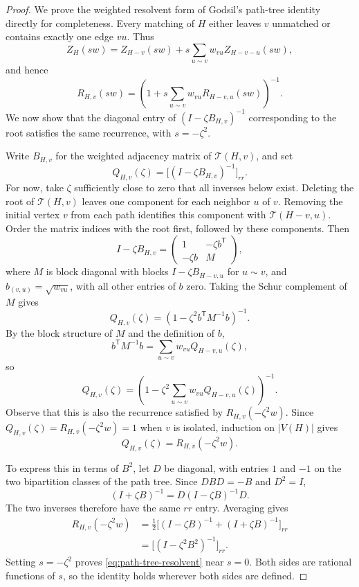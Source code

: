 \documentclass[11pt,reqno,letterpaper]{amsart}
\numberwithin{equation}{section}
\theoremstyle{definition}
\theoremstyle{remark}
\begin{document}
\begin{proof}
We prove the weighted resolvent form of Godsil's
path-tree identity~\cite{Godsil} directly for completeness.
Every matching of $H$ either leaves $v$ unmatched or contains
exactly one edge $vu$. Thus
\[
 Z_H(sw)=Z_{H-v}(sw)
       +s\sum_{u\sim v}w_{vu}Z_{H-v-u}(sw),
\]
and hence
\[
 R_{H,v}(sw)
 =\left(1+s\sum_{u\sim v}w_{vu}R_{H-v,u}(sw)\right)^{-1}.
\]
We now show that the diagonal entry of $(I-\zeta B_{H,v})^{-1}$
corresponding to the root satisfies the same recurrence,
with $s=-\zeta^2$.

Write $B_{H,v}$ for the weighted adjacency matrix of
$\mathcal T(H,v)$, and set
\[
 Q_{H,v}(\zeta)
 =\bigl[(I-\zeta B_{H,v})^{-1}\bigr]_{rr}.
\]
For now, take $\zeta$ sufficiently close to zero that all
inverses below exist.
Deleting the root of $\mathcal T(H,v)$ leaves one component
for each neighbor $u$ of $v$.
Removing the initial vertex $v$ from each path identifies
this component with $\mathcal T(H-v,u)$. Order the matrix indices with the root first, followed by
these components. Then
\[
 I-\zeta B_{H,v}
 =\begin{pmatrix}
    1&-\zeta b^{\mathsf T}\\
    -\zeta b&M
   \end{pmatrix},
\]
where $M$ is block diagonal with blocks $I-\zeta B_{H-v,u}$
for $u\sim v$, and $b_{(v,u)}=\sqrt{w_{vu}}$, with all other
entries of $b$ zero.
Taking the Schur complement of $M$ gives
\[
 Q_{H,v}(\zeta)
 =\left(1-\zeta^2b^{\mathsf T}M^{-1}b\right)^{-1}.
\]
By the block structure of $M$ and the definition of $b$,
\[
 b^{\mathsf T}M^{-1}b
 =\sum_{u\sim v}w_{vu}Q_{H-v,u}(\zeta),
\]
so
\[
 Q_{H,v}(\zeta)
 =\left(1-\zeta^2\sum_{u\sim v}
                   w_{vu}Q_{H-v,u}(\zeta)\right)^{-1}.
\]
Observe that this is also the recurrence satisfied by
$R_{H,v}(-\zeta^2w)$.
Since $Q_{H,v}(\zeta)=R_{H,v}(-\zeta^2w)=1$ when $v$ is isolated,
induction on $|V(H)|$ gives
\[
 Q_{H,v}(\zeta)=R_{H,v}(-\zeta^2w).
\]


To express this in terms of $B^2$, let $D$ be diagonal,
with entries $1$ and $-1$ on the two bipartition classes
of the path tree.
Since $DBD=-B$ and $D^2=I$,
\[
 (I+\zeta B)^{-1}=D(I-\zeta B)^{-1}D.
\]
The two inverses therefore have the same $rr$ entry.
Averaging gives
\begin{align*}
 R_{H,v}(-\zeta^2w)
 &=\frac12\bigl[(I-\zeta B)^{-1}
                  +(I+\zeta B)^{-1}\bigr]_{rr}\\
 &=\bigl[(I-\zeta^2B^2)^{-1}\bigr]_{rr}.
\end{align*}
Setting $s=-\zeta^2$ proves \cref{eq:path-tree-resolvent}
near $s=0$. Both sides are rational functions of $s$,
so the identity holds wherever both sides are defined.


\end{proof}
\end{document}
